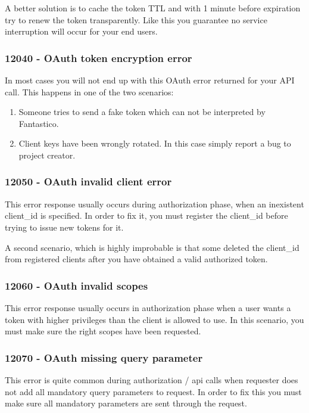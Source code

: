 \documentclass[letterpaper,10pt,english]{sphinxmanual}
\begin{document}
A better solution is to cache the token TTL and with 1 minute before expiration try to renew the token transparently. Like this
you guarantee no service interruption will occur for your end users.


\subsubsection{12040 - OAuth token encryption error}
\label{features/oauth2/exceptions/12040:oauth-token-encryption-error}\label{features/oauth2/exceptions/12040::doc}
In most cases you will not end up with this OAuth error returned for your API call. This happens in one of the two scenarios:
\begin{enumerate}
\item {} 
Someone tries to send a fake token which can not be interpreted by Fantastico.

\item {} 
Client keys have been wrongly rotated. In this case simply report a bug to project creator.

\end{enumerate}


\subsubsection{12050 - OAuth invalid client error}
\label{features/oauth2/exceptions/12050:oauth-invalid-client-error}\label{features/oauth2/exceptions/12050::doc}
This error response usually occurs during authorization phase, when an inexistent client\_id is specified. In order to fix it,
you must register the client\_id before trying to issue new tokens for it.

A second scenario, which is highly improbable is that some deleted the client\_id from registered clients after you have obtained
a valid authorized token.


\subsubsection{12060 - OAuth invalid scopes}
\label{features/oauth2/exceptions/12060:oauth-invalid-scopes}\label{features/oauth2/exceptions/12060::doc}
This error response usually occurs in authorization phase when a user wants a token with higher privileges than the client is
allowed to use. In this scenario, you must make sure the right scopes have been requested.


\subsubsection{12070 - OAuth missing query parameter}
\label{features/oauth2/exceptions/12070:oauth-missing-query-parameter}\label{features/oauth2/exceptions/12070::doc}
This error is quite common during authorization / api calls when requester does not add all mandatory query parameters to request.
In order to fix this you must make sure all mandatory parameters are sent through the request.
\end{document}
